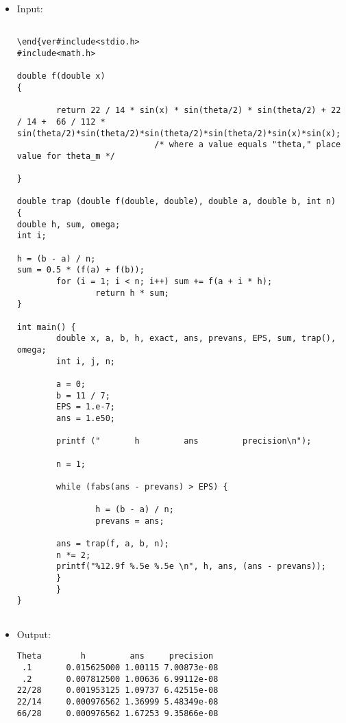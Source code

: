 \documentclass[10pt]{article}
\begin{document}
\begin{itemize}
 \item Input:
\begin{verbatim}

\end{ver#include<stdio.h>
#include<math.h>

double f(double x)
{

        return 22 / 14 * sin(x) * sin(theta/2) * sin(theta/2) + 22 / 14 +  66 / 112 * sin(theta/2)*sin(theta/2)*sin(theta/2)*sin(theta/2)*sin(x)*sin(x);
                            /* where a value equals "theta," place value for theta_m */

}

double trap (double f(double, double), double a, double b, int n)
{
double h, sum, omega;
int i;

h = (b - a) / n;                                      
sum = 0.5 * (f(a) + f(b));                            
        for (i = 1; i < n; i++) sum += f(a + i * h);  
                return h * sum;                       
}

int main() {
        double x, a, b, h, exact, ans, prevans, EPS, sum, trap(), omega;
        int i, j, n;
        
        a = 0;
        b = 11 / 7;
        EPS = 1.e-7;
        ans = 1.e50;
        
        printf ("       h         ans         precision\n");
        
        n = 1;

        while (fabs(ans - prevans) > EPS) {
                
                h = (b - a) / n;
                prevans = ans;
		
		ans = trap(f, a, b, n);
		n *= 2;
		printf("%12.9f %.5e %.5e \n", h, ans, (ans - prevans));
		}
        }	
}


\end{verbatim}
\item Output:

\begin{verbatim}
Theta        h         ans     precision
 .1       0.015625000 1.00115 7.00873e-08 
 .2       0.007812500 1.00636 6.99112e-08 
22/28     0.001953125 1.09737 6.42515e-08 
22/14     0.000976562 1.36999 5.48349e-08
66/28     0.000976562 1.67253 9.35866e-08 

  
\end{verbatim}


\end{itemize}
\end{document}

